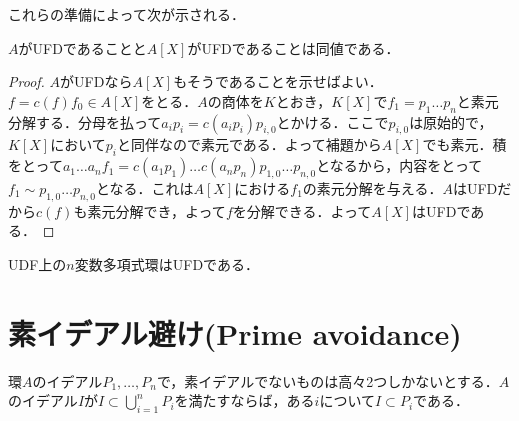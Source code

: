 これらの準備によって次が示される．

\begin{thm}
	$A$がUFDであることと$A[X]$がUFDであることは同値である．
\end{thm}

\begin{proof}
	$A$がUFDなら$A[X]$もそうであることを示せばよい．$f=c(f)f_0\in A[X]$をとる．$A$の商体を$K$とおき，$K[X]$で$f_1=p_1\dots p_n$と素元分解する．分母を払って$a_ip_i=c(a_ip_i)p_{i,0}$とかける．ここで$p_{i,0}$は原始的で，$K[X]$において$p_i$と同伴なので素元である．よって補題から$A[X]$でも素元．積をとって$a_1\dots a_n f_1=c(a_1p_1)\dots c(a_np_n)p_{1,0}\dots p_{n,0}$となるから，内容をとって$f_1\sim p_{1,0}\dots p_{n,0}$となる．これは$A[X]$における$f_1$の素元分解を与える．$A$はUFDだから$c(f)$も素元分解でき，よって$f$を分解できる．よって$A[X]$はUFDである．
\end{proof}

\begin{cor}\label{cor:多変数もUFD}
	UDF上の$n$変数多項式環はUFDである．
\end{cor}


\section{素イデアル避け(Prime avoidance)}

\begin{lem}\label{lem:Prime avoidance}
	環$A$のイデアル$P_1,\dots, P_n$で，素イデアルでないものは高々2つしかないとする．$A$のイデアル$I$が$I\subset\bigcup_{i=1}^n P_i$を満たすならば，ある$i$について$I\subset P_i$である．
\end{lem}

